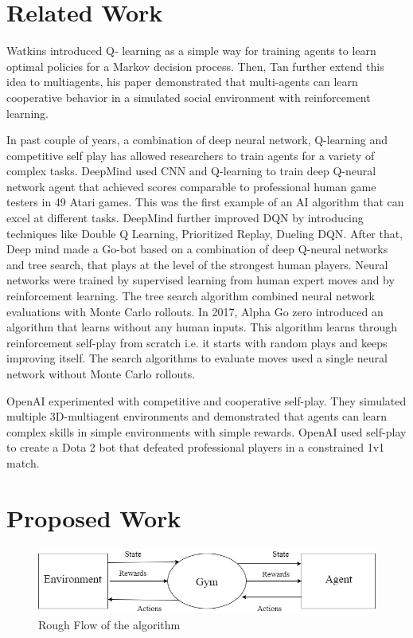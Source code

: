 \documentclass[conference]{IEEEtran}
\begin{document}
\section{Related Work}
Watkins\cite{sp1} introduced Q- learning as a simple way for training agents to learn
optimal policies for a Markov decision process. Then, Tan\cite{sp2} further extend
this idea to multiagents, his paper demonstrated that 
multi-agents can learn cooperative behavior in a simulated social environment with reinforcement learning.

In past couple of years, a combination of deep neural network, Q-learning and
competitive self play has allowed researchers to train agents for a variety
of complex tasks. DeepMind\cite{sp3} used CNN and Q-learning to train deep Q-neural
network agent that achieved scores comparable to professional human game
testers in 49 Atari games. This was the first example of an AI algorithm
that can excel at different tasks. DeepMind further improved DQN by introducing
techniques like Double Q Learning\cite{sp4}, Prioritized Replay\cite{sp5}, Dueling DQN\cite{sp6}.  After
that, Deep mind made a Go-bot\cite{sp7} based on a combination of deep Q-neural
networks and tree search, that plays at the level of the strongest human
players. Neural networks were trained by supervised learning from human
expert moves and by reinforcement learning. The tree search algorithm
combined neural network evaluations with Monte Carlo rollouts. In 2017, Alpha
Go zero\cite{sp8} introduced an algorithm that learns without any human inputs.
This algorithm learns through reinforcement self-play from scratch i.e. it starts
 with random plays and keeps improving itself. The search algorithms to evaluate moves used a single
 neural network without Monte Carlo rollouts.

OpenAI experimented with competitive and cooperative self-play\cite{sp9}. They simulated
multiple 3D-multiagent environments and demonstrated that agents can learn
complex skills in simple environments with simple rewards. OpenAI\cite{sp10} used
self-play to create a Dota 2 bot that defeated professional players in a
constrained 1v1 match.

\section{Proposed Work}
\begin{figure}[h]

	\includegraphics[width=\linewidth]{flow.jpg}
	\caption{Rough Flow of the algorithm}

\end{figure}
\end{document}
